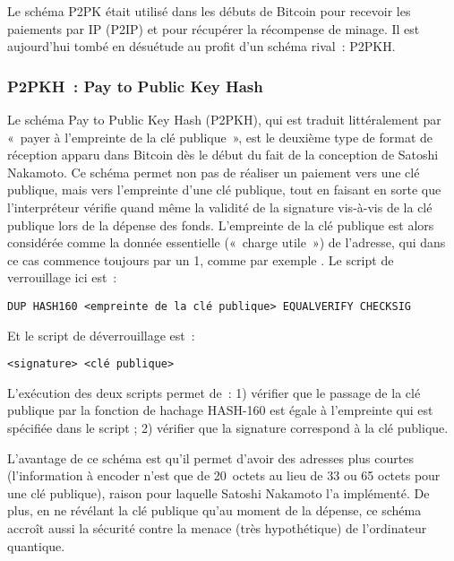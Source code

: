 Le schéma P2PK était utilisé dans les débuts de Bitcoin pour recevoir les paiements par IP (P2IP) et pour récupérer la récompense de minage. Il est aujourd'hui tombé en désuétude au profit d'un schéma rival~: P2PKH.


\subsubsection*{P2PKH~: Pay to Public Key Hash} Le schéma Pay to Public Key Hash (P2PKH), qui est traduit littéralement par «~payer à l'empreinte de la clé publique~», est le deuxième type de format de réception apparu dans Bitcoin dès le début du fait de la conception de Satoshi Nakamoto. Ce schéma permet non pas de réaliser un paiement vers une clé publique, mais vers l'empreinte d'une clé publique, tout en faisant en sorte que l'interpréteur vérifie quand même la validité de la signature vis-à-vis de la clé publique lors de la dépense des fonds. L'empreinte de la clé publique est alors considérée comme la donnée essentielle («~charge utile~») de l'adresse, qui dans ce cas commence toujours par un 1, comme par exemple . Le script de verrouillage ici est~:

\begin{Verbatim}[fontsize=\footnotesize]
DUP HASH160 <empreinte de la clé publique> EQUALVERIFY CHECKSIG
\end{Verbatim}

Et le script de déverrouillage est~:

\begin{Verbatim}[fontsize=\footnotesize]
<signature> <clé publique>
\end{Verbatim}

L'exécution des deux scripts permet de~: 1) vérifier que le passage de la clé publique par la fonction de hachage HASH-160 est égale à l'empreinte qui est spécifiée dans le script ; 2) vérifier que la signature correspond à la clé publique.

L'avantage de ce schéma est qu'il permet d'avoir des adresses plus courtes (l'information à encoder n'est que de 20~octets au lieu de 33 ou 65 octets pour une clé publique), raison pour laquelle Satoshi Nakamoto l'a implémenté. De plus, en ne révélant la clé publique qu'au moment de la dépense, ce schéma accroît aussi la sécurité contre la menace (très hypothétique) de l'ordinateur quantique.



